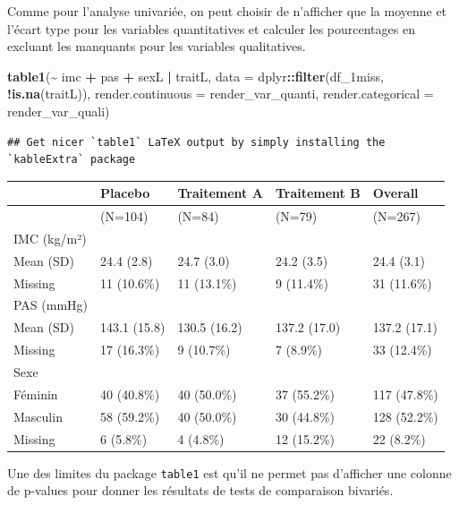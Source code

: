\documentclass[
]{book}
\newenvironment{Shaded}{\begin{snugshade}}{\end{snugshade}}
\newcommand{\AttributeTok}[1]{\textcolor[rgb]{0.13,0.29,0.53}{#1}}
\newcommand{\FunctionTok}[1]{\textcolor[rgb]{0.13,0.29,0.53}{\textbf{#1}}}
\newcommand{\NormalTok}[1]{#1}
\newcommand{\SpecialCharTok}[1]{\textcolor[rgb]{0.81,0.36,0.00}{\textbf{#1}}}
\begin{document}
Comme pour l'analyse univariée, on peut choisir de n'afficher que la moyenne et l'écart type pour les variables quantitatives et calculer les pourcentages en excluant les manquants pour les variables qualitatives.

\begin{Shaded}
\begin{Highlighting}[]
\FunctionTok{table1}\NormalTok{(}\SpecialCharTok{\textasciitilde{}}\NormalTok{ imc }\SpecialCharTok{+}\NormalTok{ pas }\SpecialCharTok{+}\NormalTok{ sexL }\SpecialCharTok{|}\NormalTok{ traitL, }
       \AttributeTok{data =}\NormalTok{ dplyr}\SpecialCharTok{::}\FunctionTok{filter}\NormalTok{(df\_1miss, }\SpecialCharTok{!}\FunctionTok{is.na}\NormalTok{(traitL)),}
       \AttributeTok{render.continuous =}\NormalTok{ render\_var\_quanti, }
       \AttributeTok{render.categorical =}\NormalTok{ render\_var\_quali) }
\end{Highlighting}
\end{Shaded}

\begin{verbatim}
## Get nicer `table1` LaTeX output by simply installing the `kableExtra` package
\end{verbatim}

\begin{tabular}{lllll}
\toprule
  & Placebo & Traitement A & Traitement B & Overall\\
\midrule
 & (N=104) & (N=84) & (N=79) & (N=267)\\
IMC (kg/m²) &  &  &  & \\
Mean (SD) & 24.4 (2.8) & 24.7 (3.0) & 24.2 (3.5) & 24.4 (3.1)\\
Missing & 11 (10.6\%) & 11 (13.1\%) & 9 (11.4\%) & 31 (11.6\%)\\
PAS (mmHg) &  &  &  & \\
\addlinespace
Mean (SD) & 143.1 (15.8) & 130.5 (16.2) & 137.2 (17.0) & 137.2 (17.1)\\
Missing & 17 (16.3\%) & 9 (10.7\%) & 7 (8.9\%) & 33 (12.4\%)\\
Sexe &  &  &  & \\
Féminin & 40 (40.8\%) & 40 (50.0\%) & 37 (55.2\%) & 117 (47.8\%)\\
Masculin & 58 (59.2\%) & 40 (50.0\%) & 30 (44.8\%) & 128 (52.2\%)\\
\addlinespace
Missing & 6 (5.8\%) & 4 (4.8\%) & 12 (15.2\%) & 22 (8.2\%)\\
\bottomrule
\end{tabular}

Une des limites du package \texttt{table1} est qu'il ne permet pas d'afficher une colonne de p-values pour donner les résultats de tests de comparaison bivariés.
\end{document}
